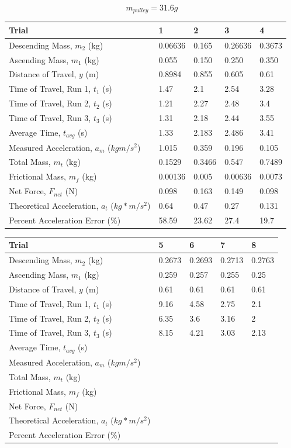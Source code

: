 \documentclass[11pt, titlepage]{article}
\begin{document}
\begin{center}
$$m_{pulley} = 31.6 g$$
\begin{tabular}
{|m{7em}|m{7em}|m{7em}|m{7em}|m{7em}|}
\hline
Trial & 1 & 2 & 3 & 4 \\
\hline
Descending Mass, $m_2$ (kg) & 0.06636 & 0.165 & 0.26636 & 0.3673\\
\hline
Ascending Mass, $m_1$ (kg) & 0.055 & 0.150 & 0.250 & 0.350\\
\hline
Distance of Travel, $y$ (m) & 0.8984 & 0.855 & 0.605 & 0.61\\
\hline
Time of Travel, Run 1, $t_1$ (s) & 1.47 & 2.1 & 2.54 & 3.28\\
\hline
Time of Travel, Run 2, $t_2$ (s) & 1.21 & 2.27 & 2.48 & 3.4\\
\hline
Time of Travel, Run 3, $t_3$ (s) & 1.31 & 2.18 & 2.44 & 3.55\\
\hline
Average Time, $t_{avg}$ (s) & 1.33 & 2.183 & 2.486 & 3.41\\
\hline
Measured Acceleration, $a_m$ ($kgm/s^2$) & 1.015 & 0.359 & 0.196 & 0.105\\
\hline
Total Mass, $m_t$ (kg) & 0.1529 & 0.3466 & 0.547 & 0.7489\\
\hline
Frictional Mass, $m_f$ (kg) & 0.00136 & 0.005 & 0.00636 & 0.0073\\
\hline
Net Force, $F_{net}$ (N) & 0.098 & 0.163 & 0.149 & 0.098\\ 
\hline
Theoretical Acceleration, $a_t$ ($kg*m/s^2$) & 0.64 & 0.47 & 0.27 & 0.131\\
\hline
Percent Acceleration Error (\%) & 58.59 & 23.62 & 27.4 & 19.7\\
\hline
\end{tabular}
\begin{tabular}
{|m{7em}|m{7em}|m{7em}|m{7em}|m{7em}|}
\hline
Trial & 5 & 6 & 7 & 8 \\
\hline
Descending Mass, $m_2$ (kg) & 0.2673 & 0.2693 & 0.2713& 0.2763\\
\hline
Ascending Mass, $m_1$ (kg) & 0.259 & 0.257 & 0.255 & 0.25\\
\hline
Distance of Travel, $y$ (m) & 0.61 & 0.61 & 0.61 & 0.61\\
\hline
Time of Travel, Run 1, $t_1$ (s) & 9.16& 4.58& 2.75& 2.1\\
\hline
Time of Travel, Run 2, $t_2$ (s) & 6.35& 3.6 & 3.16 & 2\\
\hline
Time of Travel, Run 3, $t_3$ (s) & 8.15& 4.21 & 3.03 & 2.13\\
\hline
Average Time, $t_{avg}$ (s) & & & & \\
\hline
Measured Acceleration, $a_m$ ($kgm/s^2$) & & & & \\
\hline
Total Mass, $m_t$ (kg) & & & & \\
\hline
Frictional Mass, $m_f$ (kg) & & & & \\
\hline
Net Force, $F_{net}$ (N) & & & & \\ 
\hline
Theoretical Acceleration, $a_t$ ($kg*m/s^2$) & & & & \\
\hline
Percent Acceleration Error (\%) & & & & \\
\hline
\end{tabular}
\end{center}
\end{document}
